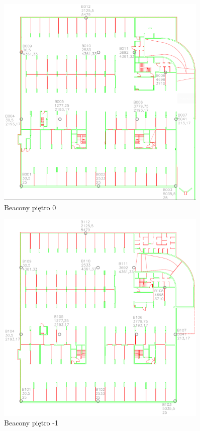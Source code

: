 \documentclass[12pt,a4paper]{article}
\begin{document}
\begin{figure}[htb!p]
\begin{center}
\includegraphics[width=0.9\textwidth]{beacon_0.png}
\caption{Beacony piętro 0}
\end{center}
\end{figure}

\begin{figure}[htb!p]
\begin{center}
\includegraphics[width=0.9\textwidth]{beacon_-1.png}
\caption{Beacony piętro -1}
\end{center}
\end{figure}
\end{document}
